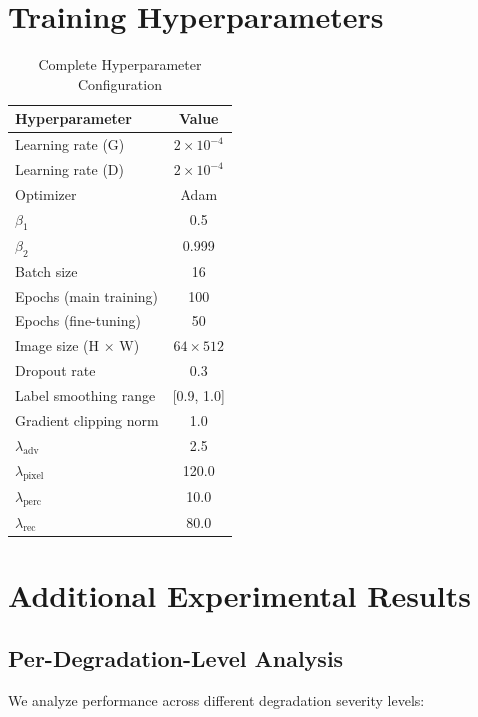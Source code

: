 \documentclass[journal]{IEEEtran}
\begin{document}
\section{Training Hyperparameters}


\begin{table}[!h]
\renewcommand{\arraystretch}{1.3}
\caption{Complete Hyperparameter Configuration}
\label{table_hyperparams}
\centering
\begin{tabular}{|l|c|}
\hline
\textbf{Hyperparameter} & \textbf{Value} \\
\hline
Learning rate (G) & $2 \times 10^{-4}$ \\
Learning rate (D) & $2 \times 10^{-4}$ \\
Optimizer & Adam \\
$\beta_1$ & 0.5 \\
$\beta_2$ & 0.999 \\
Batch size & 16 \\
Epochs (main training) & 100 \\
Epochs (fine-tuning) & 50 \\
Image size (H × W) & $64 \times 512$ \\
Dropout rate & 0.3 \\
Label smoothing range & [0.9, 1.0] \\
Gradient clipping norm & 1.0 \\
$\lambda_{\text{adv}}$ & 2.5 \\
$\lambda_{\text{pixel}}$ & 120.0 \\
$\lambda_{\text{perc}}$ & 10.0 \\
$\lambda_{\text{rec}}$ & 80.0 \\
\hline
\end{tabular}
\end{table}

\section{Additional Experimental Results}


\subsection{Per-Degradation-Level Analysis}

We analyze performance across different degradation severity levels:
\end{document}
